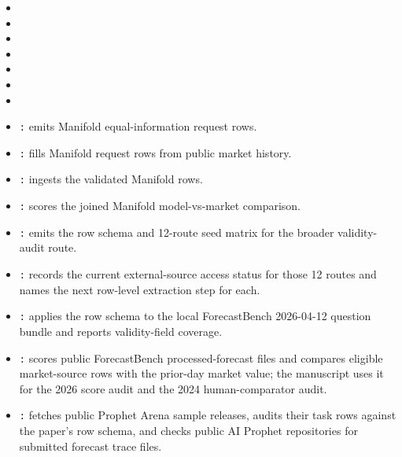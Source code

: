 \documentclass[11pt]{article}
\begin{document}
\begin{itemize}[leftmargin=*]
\item \texttt{}
\item \texttt{}
\item \texttt{}
\item \texttt{}
\item \texttt{}
\item \texttt{}
\item \texttt{}
\item \texttt{:} emits Manifold equal-information request rows.
\item \texttt{:} fills Manifold request rows from public market history.
\item \texttt{:} ingests the validated Manifold rows.
\item \texttt{:} scores the joined Manifold model-vs-market comparison.
\item \texttt{:} emits the row schema and 12-route seed matrix for the broader validity-audit route.
\item \texttt{:} records the current external-source access status for those 12 routes and names the next row-level extraction step for each.
\item \texttt{:} applies the row schema to the local ForecastBench 2026-04-12 question bundle and reports validity-field coverage.
\item \texttt{:} scores public ForecastBench processed-forecast files and compares eligible market-source rows with the prior-day market value; the manuscript uses it for the 2026 score audit and the 2024 human-comparator audit.
\item \texttt{:} fetches public Prophet Arena sample releases, audits their task rows against the paper's row schema, and checks public AI Prophet repositories for submitted forecast trace files.

\end{itemize}
\end{document}
